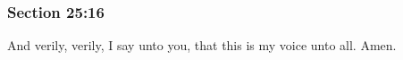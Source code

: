 	\subsubsection{Section 25:16} %
		\label{DC25-16}

		And verily, verily, I say unto you, that this is my voice unto all.  Amen.


